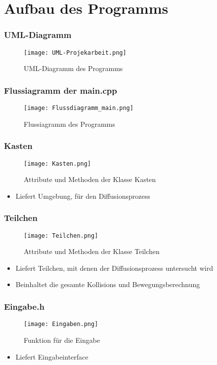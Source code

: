 \documentclass{beamer}
\begin{document}
\section{Aufbau des Programms}

\begin{frame} %
  \frametitle{UML-Diagramm} %
  \begin{figure}[htb]
		\centering
		\texttt{[image: UML-Projekarbeit.png]}
		\caption{UML-Diagramm des Programms}
  \end{figure}
\end{frame}

\begin{frame} %
  \frametitle{Flussiagramm der main.cpp} %
  \begin{figure}[htb]
		\centering
		\texttt{[image: Flussdiagramm\_main.png]}
		\caption{Flussiagramm des Programms}
  \end{figure}
\end{frame}

\begin{frame} %
  \frametitle{Kasten} %
  \begin{figure}
		\centering
		\texttt{[image: Kasten.png]}
		\caption{Attribute und Methoden der Klasse Kasten}
  \end{figure}
  \begin{itemize}
  	\item Liefert Umgebung, für den Diffusionsprozess
  \end{itemize}
\end{frame}

\begin{frame} %
	  \frametitle{Teilchen} %
 \begin{figure}
		\centering
		\texttt{[image: Teilchen.png]}
		\caption{Attribute und Methoden der Klasse Teilchen}
  \end{figure}
  	\begin{itemize}
	  	\item Liefert Teilchen, mit denen der Diffusionsprozess untersucht wird
	 	\item Beinhaltet die gesamte Kollisions und Bewegungsberechnung
	\end{itemize}
\end{frame}

\begin{frame} %
  \frametitle{Eingabe.h} %
  \begin{figure}
		\centering
		\texttt{[image: Eingaben.png]}
		\caption{Funktion für die Eingabe}
  \end{figure}
  \begin{itemize}
  	\item Liefert Eingabeinterface
  \end{itemize}
\end{frame}
\end{document}
